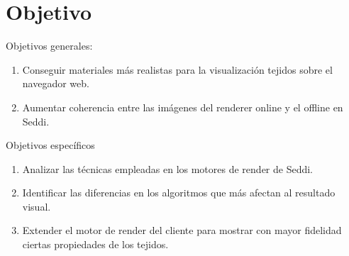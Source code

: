 \chapter{Objetivo}

Objetivos generales:
\begin{enumerate}
    \item Conseguir materiales m\'as realistas para la visualizaci\'on tejidos sobre el navegador web.
    \item Aumentar coherencia entre las im\'agenes del renderer online y el offline en Seddi.
\end{enumerate}

Objetivos espec\'ificos
\begin{enumerate}
    \item Analizar las t\'ecnicas empleadas en los motores de render de Seddi. 
    \item Identificar las diferencias en los algoritmos que m\'as afectan al resultado visual.
    \item Extender el motor de render del cliente para mostrar con mayor fidelidad ciertas propiedades
          de los tejidos.
  \end{enumerate}
